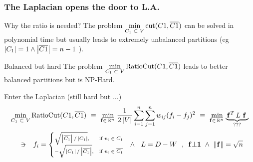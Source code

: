 \begin{frame}
  \frametitle{The Laplacian opens the door to L.A.}
  \begin{block}{Why the ratio is needed?}
    The problem $\min\limits_{C_1 \,\,\subset\,\, V} \operatorname{cut}(C1,\overline{C1})$ can be solved in polynomial time but usually leads to extremely unbalanced partitions (eg \scriptsize
    $\left\lvert C_1 \right\vert=1 \land \left\lvert \overline{C1} \right\vert=n-1$
    \normalsize).
  \end{block}
  \begin{block}{Balanced but hard}
    The problem $\min\limits_{C_1 \,\,\subset\,\, V} \operatorname{RatioCut}(C1,\overline{C1})$ leads to better balanced partitions but is NP-Hard.
  \end{block}
  \begin{block}{Enter the Laplacian (still hard but ...)}
\setlength\abovedisplayskip{0pt}
\[
\min\limits_{C_1 \,\,\subset\,\, V} \operatorname{RatioCut}(C1,\overline{C1})
\,\,\equiv\,\, \min\limits_{\mathbf{f} \in \,\mathbb{R}^{n}\,}
 \frac{1}{2\left\lvert V \right\vert}\sum\limits_{i=1}^{n} \sum\limits_{j=1}^n w_{ij} (f_i - f_j)^2
\,\,\equiv\,\, \min\limits_{\mathbf{f} \in \,\mathbb{R}^{n}\,}
  \underbrace{\,{\mathbf{f}}^{T}\, L \,\,\mathbf{f}\,\,}_{\text{???}}
\]
\[
\setlength\abovedisplayskip{0pt}
\ds{\suchthat}
f_i =
\scriptsize
\begin{cases}
  \sqrt{\abs{\stcomp{C_1}}/\abs{C_1}}, & \text{if } v_i \in C_1 \\
  -\sqrt{\abs{C_1}/\abs{\stcomp{C_1}}}, & \text{if } v_i \in \stcomp{C_1}
\end{cases}
\normalsize
\ds{\ds{\land}}
L = D - W
\ds{\ds{\text{,}}}
\vec{f} \bot \vec{1}
\ds{\land}
\norm{\vec{f}} = \sqrt{n}
\]
  \end{block}    
\end{frame}
